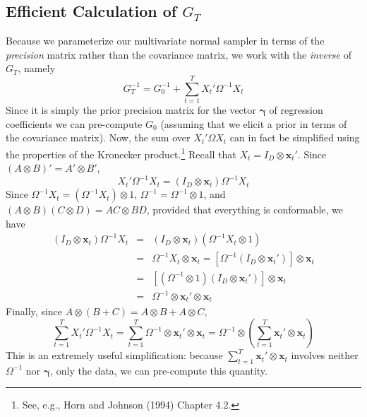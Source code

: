 \documentclass[12pt]{article}
\begin{document}
\subsection{Efficient Calculation of $G_T$}
Because we parameterize our multivariate normal sampler in terms of the \emph{precision} matrix rather than the covariance matrix, we work with the \emph{inverse} of $G_T$, namely
\begin{equation*}
  G_T^{-1} =  G_0^{-1} + \sum_{t=1}^T X_t' \Omega^{-1} X_t 
\end{equation*}
Since it is simply the prior precision matrix for the vector $\boldsymbol{\gamma}$ of regression coefficients we can pre-compute $G_0$ (assuming that we elicit a prior in terms of the covariance matrix).
Now, the sum over $X_t' \Omega X_t$ can in fact be simplified using the properties of the Kronecker product.\footnote{See, e.g., Horn and Johnson (1994) Chapter 4.2.}
Recall that $X_t = I_D \otimes \mathbf{x}_t'$.
Since $\left( A\otimes B \right)' = A' \otimes B'$, 
\begin{equation*}
  X_t' \Omega^{-1} X_t = \left( I_D \otimes \mathbf{x}_t \right) \Omega^{-1}X_t
\end{equation*}
Since $\Omega^{-1}X_t = \left( \Omega^{-1}X_t \right) \otimes 1$, $\Omega^{-1} = \Omega^{-1}\otimes 1$, and $(A \otimes B)(C \otimes D) = AC \otimes BD$, provided that everything is conformable, we have
\begin{eqnarray*}
  \left( I_D \otimes \mathbf{x}_t \right) \Omega^{-1}X_t &=&  \left( I_D \otimes \mathbf{x}_t \right) (\Omega^{-1}X_t \otimes 1)\\
  &=&  \Omega^{-1} X_t \otimes \mathbf{x}_t = \left[\Omega^{-1} (I_D \otimes \mathbf{x}_t') \right]\otimes \mathbf{x}_t \\
  &=& \left[(\Omega^{-1} \otimes 1)(I_D \otimes \mathbf{x}_t') \right]\otimes \mathbf{x}_t \\
  &=& \Omega^{-1} \otimes \mathbf{x}_t' \otimes \mathbf{x}_t
\end{eqnarray*}
Finally, since  $A \otimes (B + C) = A\otimes B + A \otimes C$,
\begin{equation*}
  \sum_{t=1}^{T} X_t' \Omega^{-1} X_t = \sum_{t=1}^{T} \Omega^{-1} \otimes \mathbf{x}_t' \otimes \mathbf{x}_t = \Omega^{-1} \otimes \left(\sum_{t=1}^T  \mathbf{x}_t' \otimes \mathbf{x}_t \right)
\end{equation*}
This is an extremely useful simplification: because $\sum_{t=1}^T  \mathbf{x}_t' \otimes \mathbf{x}_t$ involves neither $\Omega^{-1}$ nor $\boldsymbol{\gamma}$, only the data, we can pre-compute this quantity.
\end{document}
